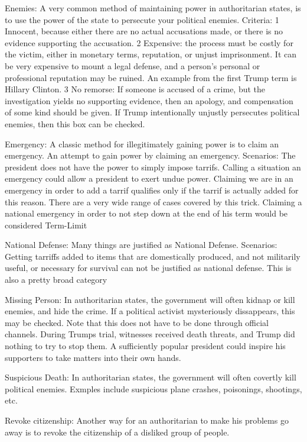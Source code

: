 \documentclass{article}
\begin{document}
Enemies: A very common method of maintaining power in authoritarian states, is to use the power
of the state to persecute your political enemies.
Criteria: 1 Innocent, because either there are no
actual accusations made, or there is no evidence supporting the accusation.
2  Expensive: the process must be costly for the victim, either in monetary terms,
reputation, or unjust imprisonment.  It can be very expensive
to mount a legal defense, and a person's personal or professional reputation may be ruined.
An example from the first Trump term is Hillary Clinton.
3  No remorse:  If someone is accused of a crime, but the investigation yields no supporting
evidence, then an apology, and compensation of some kind should be given.
If Trump intentionally unjustly persecutes political enemies, then this box can be checked.

Emergency: A classic method for illegitimately gaining power is to claim an emergency.
An attempt to gain power by claiming an emergency.
Scenarios: The president does not have the power to simply impose tarrifs.
Calling a situation an emergency could allow a president to exert undue power.
Claiming we are in an emergency in order to add a tarrif qualifies only if the tarrif is
actually added
for this reason.  There are a very wide range of cases covered by this trick.
Claiming a national emergency in order to not step down at the end of his term
would be considered Term-Limit

National Defense: Many things are justified as National Defense.
Scenarios: Getting tarriffs added to items that are domestically produced, and not militarily useful,
or necessary for survival can not be justified as national defense.  This is also a pretty broad
category

Missing Person:  In authoritarian states, the government will often kidnap or kill enemies, and
hide the crime.  If a political activist mysteriously dissappears, this may be checked.  Note
that this does not have to be done through official channels.  During Trumps trial, witnesses
received death threats, and Trump did nothing to try to stop them.  A sufficiently popular
president could inspire his supporters to take matters into their own hands.

Suspicious Death:  In authoritarian states, the government will often covertly kill political
enemies.  Exmples include suspicious plane crashes, poisonings, shootings, etc.

Revoke citizenship:  Another way for an authoritarian to make his problems go away is to revoke
the citizenship of a disliked group of people.
\end{document}
